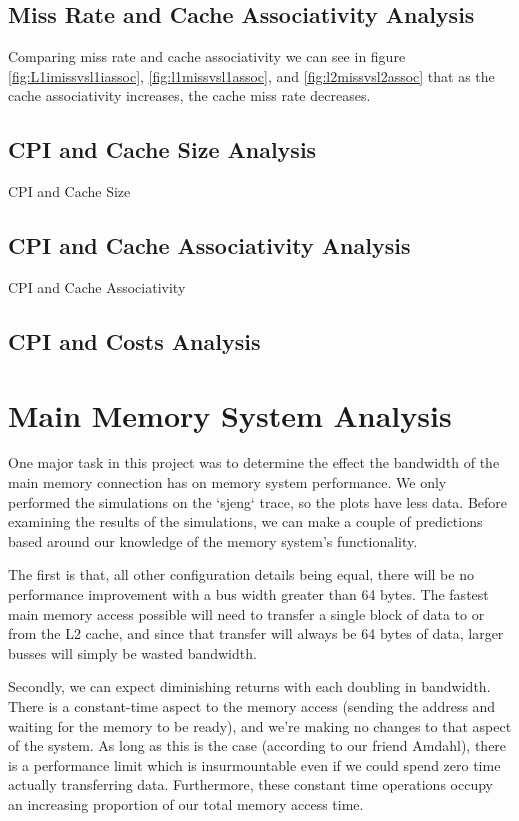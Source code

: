 \documentclass{article}
\begin{document}
\subsection{Miss Rate and Cache Associativity Analysis}

Comparing miss rate and cache associativity we can see in figure \ref{fig:L1imissvsl1iassoc}, \ref{fig:l1missvsl1assoc}, and \ref{fig:l2missvsl2assoc} that as the cache associativity increases, the cache miss rate decreases.

\subsection{CPI and Cache Size Analysis}

CPI and Cache Size

\subsection{CPI and Cache Associativity Analysis}

CPI and Cache Associativity

\subsection{CPI and Costs Analysis}

\section{Main Memory System Analysis}

One major task in this project was to determine the effect the bandwidth of the
main memory connection has on memory system performance. We only performed the
simulations on the `sjeng` trace, so the plots have less data. Before examining
the results of the simulations, we can make a couple of predictions based around
our knowledge of the memory system's functionality.

The first is that, all other configuration details being equal, there will be no
performance improvement with a bus width greater than 64 bytes. The fastest main
memory access possible will need to transfer a single block of data to or from
the L2 cache, and since that transfer will always be 64 bytes of data, larger
busses will simply be wasted bandwidth.

Secondly, we can expect diminishing returns with each doubling in bandwidth.
There is a constant-time aspect to the memory access (sending the address and
waiting for the memory to be ready), and we're making no changes to that aspect
of the system. As long as this is the case (according to our friend Amdahl),
there is a performance limit which is insurmountable even if we could spend zero
time actually transferring data. Furthermore, these constant time operations
occupy an increasing proportion of our total memory access time.
\end{document}
